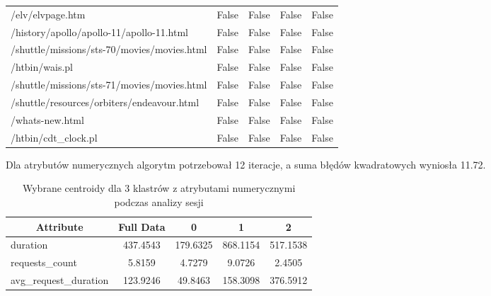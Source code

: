 \documentclass{classrep}
\begin{document}
\begin{table}[H]
{\begin{tabular}{@{}lcccc@{}}
    /elv/elvpage.htm & False & False & False & False \\
    /history/apollo/apollo-11/apollo-11.html & False & False & False & False \\
    /shuttle/missions/sts-70/movies/movies.html & False & False & False & False \\
    /htbin/wais.pl & False & False & False & False \\
    /shuttle/missions/sts-71/movies/movies.html & False & False & False & False \\
    /shuttle/resources/orbiters/endeavour.html & False & False & False & False \\
    /whats-new.html & False & False & False & False \\
    /htbin/cdt\_clock.pl & False & False & False & False \\ \bottomrule
    \end{tabular}%
    }
    \end{table}
    
    \begin{table}[H]
    \centering
    \caption{Przypisanie obserwacji dla 3 klastrów z flagami stron podczas analizy sesji}
    \end{table}
    
    Dla atrybutów numerycznych algorytm potrzebował 12 iteracje, a suma błędów kwadratowych wyniosła 11.72.

    \begin{table}[H]
    \centering
    \caption{Wybrane centroidy dla 3 klastrów z atrybutami numerycznymi podczas analizy sesji}
    \label{tab:num_3clusters_pages}
    \begin{tabular}{@{}lcccc@{}}
    \toprule
    \multicolumn{1}{c}{Attribute} & Full Data & 0 & 1 & 2 \\ \midrule
    duration & 437.4543 & 179.6325 & 868.1154 & 517.1538 \\
    requests\_count & 5.8159 & 4.7279 & 9.0726 & 2.4505 \\
    avg\_request\_duration & 123.9246 & 49.8463 & 158.3098 & 376.5912 \\ \bottomrule
    \end{tabular}
    \end{table}
\end{document}
